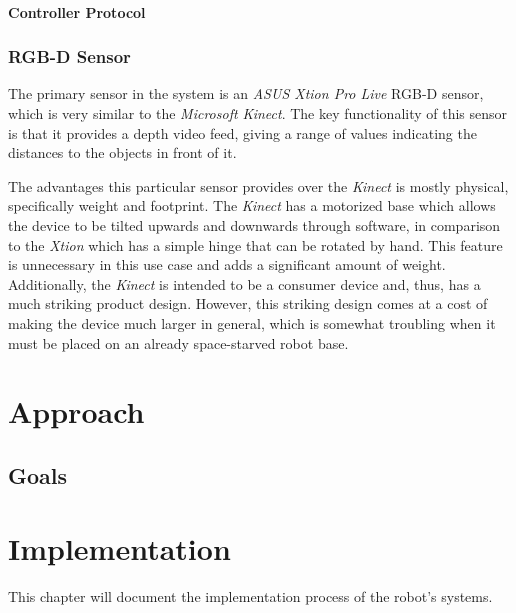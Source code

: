 \documentclass{l4proj}
\begin{document}
\subsubsection{Controller Protocol} 



\subsection{RGB-D Sensor}
The primary sensor in the system is an \emph{ASUS Xtion Pro Live} RGB-D sensor, which is very similar to the \emph{Microsoft Kinect}. The key functionality of this sensor is that it provides a depth video feed, giving a range of values indicating the distances to the objects in front of it.

The advantages this particular sensor provides over the \emph{Kinect} is mostly physical, specifically weight and footprint. The \emph{Kinect} has a motorized base which allows the device to be tilted upwards and downwards through software, in comparison to the \emph{Xtion} which has a simple hinge that can be rotated by hand. This feature is unnecessary in this use case and adds a significant amount of weight. Additionally, the \emph{Kinect} is intended to be a consumer device and, thus, has a much striking product design. However, this striking design comes at a cost of making the device much larger in general, which is somewhat troubling when it must be placed on an already space-starved robot base.


\chapter{Approach}


\section{Goals}


\chapter{Implementation}

This chapter will document the implementation process of the robot's systems.
\end{document}
